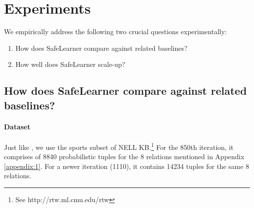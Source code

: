 \documentclass[akbc,twoside,11pt]{article}
\newcommand{\algorithmname}{SafeLearner\xspace}
\begin{document}
\section{Experiments}
\label{sec:exp}
We empirically address the following two crucial questions experimentally:
\begin{enumerate}
    \item How does \algorithmname compare against related baselines?
    \item How well does \algorithmname scale-up?
\end{enumerate}


\subsection{How does \algorithmname compare against related baselines?} \label{exp1}

\paragraph{Dataset} Just like \cite{DBLP:conf/ijcai/RaedtDTBV15}, we use the sports subset of NELL KB.\footnote{See http://rtw.ml.cmu.edu/rtw} For the 850th iteration, it comprises of 8840 probabilistic tuples for the 8 relations mentioned in Appendix \ref{appendix:1}. %
For a newer iteration (1110), it contains 14234 tuples for the same 8 relations.

%
\end{document}
